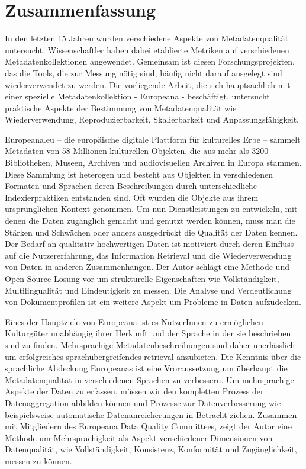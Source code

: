 \chapter*{Zusammenfassung}

In den letzten 15 Jahren wurden verschiedene Aspekte von Metadatenqualität untersucht. Wissenschaftler haben dabei etablierte Metriken auf verschiedenen Metadatenkollektionen angewendet. Gemeinsam ist diesen Forschungsprojekten, das die Tools, die zur Messung nötig sind, häufig nicht darauf ausgelegt sind wiederverwendet  zu werden. Die vorliegende Arbeit, die sich hauptsächlich mit einer spezielle Metadatenkollektion - Europeana - beschäftigt, untersucht praktische Aspekte der Bestimmung von Metadatenqualität wie Wiederverwendung, Reproduzierbarkeit, Skalierbarkeit und Anpassungsfähigkeit.

Europeana.eu -- die europäische digitale Plattform für kulturelles Erbe -- sammelt Metadaten von 58 Millionen kulturellen Objekten, die aus mehr als 3200 Bibliotheken, Museen, Archiven und audiovisuellen Archiven in Europa stammen. Diese Sammlung ist heterogen und besteht aus Objekten in verschiedenen Formaten und Sprachen deren Beschreibungen durch unterschiedliche Indexierpraktiken entstanden sind. Oft wurden die Objekte aus ihrem ursprünglichen Kontext genommen. Um nun Dienstleistungen zu entwickeln, mit denen die Daten zugänglich gemacht und genutzt werden können, muss man die Stärken und Schwächen oder anders ausgedrückt die Qualität der Daten kennen. Der Bedarf an qualitativ hochwertigen Daten ist motiviert durch deren Einfluss auf die Nutzererfahrung, das Information Retrieval und die Wiederverwendung von Daten in anderen Zusammenhängen. Der Autor schlägt eine Methode und Open Source Lösung vor um strukturelle Eigenschaften wie Vollständigkeit, Multilingualität und Eindeutigkeit zu messen. Die Analyse und Verdeutlichung von Dokumentprofilen ist ein weitere Aspekt um Probleme in Daten aufzudecken.

Eines der Hauptziele von Europeana ist es NutzerInnen zu ermöglichen Kulturgüter unabhängig ihrer Herkunft und der Sprache in der sie beschrieben sind zu finden. Mehrsprachige Metadatenbeschreibungen sind daher unerlässlich um erfolgreiches sprachübergreifendes retrieval anzubieten. Die Kenntnis über die sprachliche Abdeckung Europeanas ist eine Vroraussetzung um überhaupt die Metadatenqualität in verschiedenen Sprachen zu verbessern. Um mehrsprachige Aspekte der Daten zu erfassen, müssen wir den kompletten Prozess der Datenaggregation abbilden können und Prozesse zur Datenverbesserung wie beispielsweise automatische Datenanreicherungen in Betracht ziehen. Zusammen mit Mitgliedern des Europeana Data Quality Committees, zeigt der Autor eine Methode um Mehrsprachigkeit als Aspekt verschiedener Dimensionen von Datenqualität, wie Vollständigkeit, Konsistenz, Konformität und Zugänglichkeit, messen zu können.

